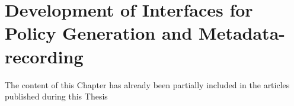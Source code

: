 \chapter{Development of Interfaces for Policy Generation and Metadata-recording}
\label{chap:dga}

\begin{tcolorbox}[colback=royallavender!40]
The content of this Chapter has already been partially included in the articles published during this Thesis %
\end{tcolorbox}

% 
% 
% 
% 
% 

